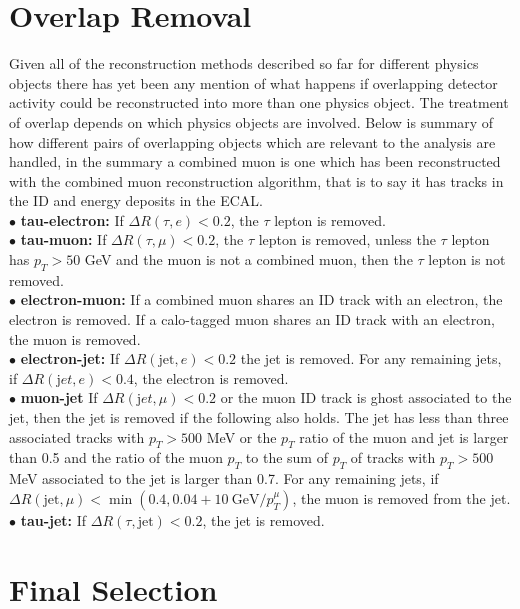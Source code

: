 \section{Overlap Removal}
Given all of the reconstruction methods described so far for different physics
objects there has yet been any mention of what happens if overlapping detector
activity could be reconstructed into more than one physics object. The treatment
of overlap depends on which physics objects are involved. Below is summary of
how different pairs of overlapping objects which are relevant to the analysis
are handled, in the summary a combined muon is one which has been reconstructed
with the combined muon reconstruction algorithm, that is to say it has tracks in
the ID and energy deposits in the ECAL.\\
$\bullet$ \textbf{tau-electron:} If $\Delta R(\tau,e)<0.2$, the $\tau$ lepton is
removed.\\
%
$\bullet$ \textbf{tau-muon:} If $\Delta R(\tau,\mu)<0.2$, the $\tau$ lepton is
removed, unless the $\tau$ lepton has $p_T>50$ GeV and the muon is not a combined
muon, then the $\tau$ lepton is not removed.\\
%
$\bullet$ \textbf{electron-muon:} If a combined muon shares an ID track with an
electron, the electron is removed. If a calo-tagged muon shares an ID track with
an electron, the muon is removed.\\
%
$\bullet$ \textbf{electron-jet:} If $\Delta R(\mathrm{jet},e)<0.2$ the jet is
removed. For any remaining jets, if $\Delta R({\mathrm jet},e)<0.4$, the
electron is removed.\\
%
$\bullet$ \textbf{muon-jet} If $\Delta R({\mathrm jet},\mu)<0.2$ or the muon ID
track is ghost associated to the jet, then the jet is removed if the following
also holds. The jet has less than three associated tracks with $p_T > 500$ MeV
or the $p_T$ ratio of the muon and jet is larger than 0.5 and the ratio of the
muon $p_T$ to the sum of $p_T$ of tracks with $p_T > 500$ MeV associated to the
jet is larger than 0.7. For any remaining jets, if $\Delta
R(\mathrm{jet},\mu)<\min(0.4, 0.04 + 10\ \mathrm{GeV} / p_T^{\mu})$, the muon is
removed from the jet.\\
%
$\bullet$ \textbf{tau-jet:} If $\Delta R(\tau,\mathrm{jet})<0.2$, the jet is
removed.


\section{Final Selection}
\label{sec:selection}

